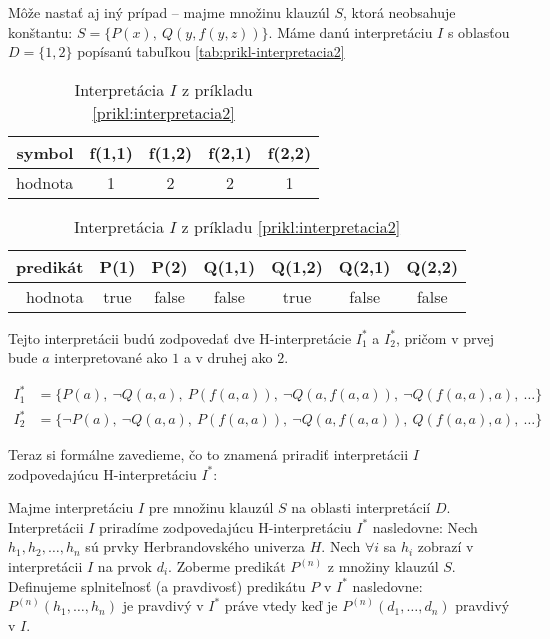 \begin{priklad}
    \label{prikl:interpretacia2}
    Môže nastať aj iný prípad -- majme množinu klauzúl $S$, ktorá neobsahuje
    konštantu: $S=\{P(x),\ Q(y,f(y,z)) \}$.
    Máme danú interpretáciu $I$ s oblasťou $D=\{1,2\}$ popísanú
    tabuľkou \ref{tab:prikl-interpretacia2}

    \begin{table}[h]
        \centering
        \begin{tabular}{|r||c|c|c|c|}
            \hline
            symbol & f(1,1) & f(1,2) & f(2,1) & f(2,2) \\
            \hline
            hodnota  & 1 & 2 & 2 & 1 \\
            \hline
        \end{tabular}
        
        \medskip
        \begin{tabular}{|r||c|c|c|c|c|c|}
            \hline
            predikát & P(1) & P(2) & Q(1,1) & Q(1,2) & Q(2,1) & Q(2,2) \\
            \hline
            hodnota & true & false & false & true & false & false \\
            \hline
        \end{tabular}
        \caption{Interpretácia $I$ z príkladu
          \ref{prikl:interpretacia2}}
        \label{tab:priklad-interpretacia2}
    \end{table}
   
    Tejto interpretácii budú zodpovedať dve H-interpretácie
    $I_1^*$ a $I_2^*$, pričom v prvej bude $a$ interpretované ako $1$ 
    a v druhej ako $2$.

    \begin{align*}
        I_1^* &= \{ P(a),\ \neg Q(a,a),\ P(f(a,a)),\ \neg Q(a,f(a,a)),\
            \neg Q(f(a,a),a),\ \dots \} \\
        I_2^* &= \{ \neg P(a),\ \neg Q(a,a),\ P(f(a,a)),\ \neg Q(a,f(a,a)),\
            Q(f(a,a),a),\ \dots \}
    \end{align*}
\end{priklad}

Teraz si formálne zavedieme, čo to znamená priradiť interpretácii $I$
zodpovedajúcu H-interpretáciu $I^*$:

\begin{definicia}
    Majme interpretáciu $I$ pre množinu klauzúl $S$ na oblasti
    interpretácií $D$. Interpretácii $I$ priradíme zodpovedajúcu
    H-interpretáciu $I^*$ nasledovne:
    Nech $h_1, h_2, \ldots, h_n$ sú prvky Herbrandovského univerza
    $H$.
    Nech $\forall i$ sa $h_i$ zobrazí v interpretácii $I$ na prvok
    $d_i$.
    Zoberme predikát $P^{(n)}$ z množiny klauzúl $S$.
    Definujeme splniteľnosť (a pravdivosť) predikátu $P$ v $I^*$
    nasledovne:
    $P^{(n)}(h_1,\dots,h_n)$ je pravdivý v $I^*$ práve vtedy keď je
    $P^{(n)}(d_1,\dots,d_n)$ pravdivý v $I$.
\end{definicia}

